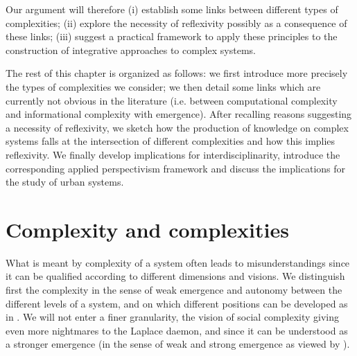 \documentclass[graybox]{svmult}
\begin{document}
Our argument will therefore (i) establish some links between different types of complexities; (ii) explore the necessity of reflexivity possibly as a consequence of these links; (iii) suggest a practical framework to apply these principles to the construction of integrative approaches to complex systems. 

The rest of this chapter is organized as follows: we first introduce more precisely the types of complexities we consider; we then detail some links which are currently not obvious in the literature (i.e. between computational complexity and informational complexity with emergence). After recalling reasons suggesting a necessity of reflexivity, we sketch how the production of knowledge on complex systems falls at the intersection of different complexities and how this implies reflexivity. We finally develop implications for interdisciplinarity, introduce the corresponding applied perspectivism framework and discuss the implications for the study of urban systems.



\section{Complexity and complexities}


What is meant by complexity of a system often leads to misunderstandings since it can be qualified according to different dimensions and visions. We distinguish first the complexity in the sense of weak emergence and autonomy between the different levels of a system, and on which different positions can be developed as in \cite{deffuant2015visions}. We will not enter a finer granularity, the vision of social complexity giving even more nightmares to the Laplace daemon, and since it can be understood as a stronger emergence (in the sense of weak and strong emergence as viewed by \cite{bedau2002downward}).
\end{document}
